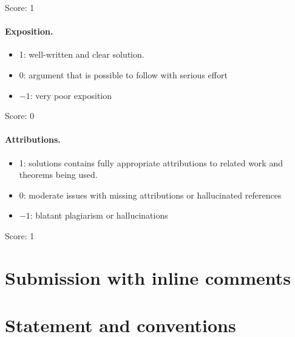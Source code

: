 \documentclass[11pt]{article}
\theoremstyle{definition}
\theoremstyle{remark}
\begin{document}
\noindent Score: 1

\paragraph{Exposition.}
\begin{itemize}
	\item  1: well-written and clear solution.
	\item  0: argument that is possible to follow with serious effort
	\item  $-1$: very poor exposition
\end{itemize}

\noindent Score: 0

\paragraph{Attributions.}
\begin{itemize}
	\item  1: solutions contains fully appropriate attributions
		to related work and theorems being used.
	\item  0: moderate issues with missing attributions or hallucinated references
	\item  $-1$: blatant plagiarism or hallucinations
\end{itemize}

\noindent Score: 1

\newpage
\section{Submission with inline comments}


\begin{abstract}
The answer is affirmative, with the cohomologous deformation allowed in
the question.  The proof first enlarges the divisor by auxiliary
symplectic hypersurfaces so that their cohomology classes satisfy a
redundancy condition.  An integral matrix of relations among these
classes then produces globally defined, smooth, nonvanishing functions
on the divisor complement.  Locally, suitable roots of monomials in
these functions are defining coordinates.  A convexity argument for
tame almost complex structures makes the required functions
holomorphic simultaneously.
\end{abstract}


\section{Statement and conventions}
\end{document}
